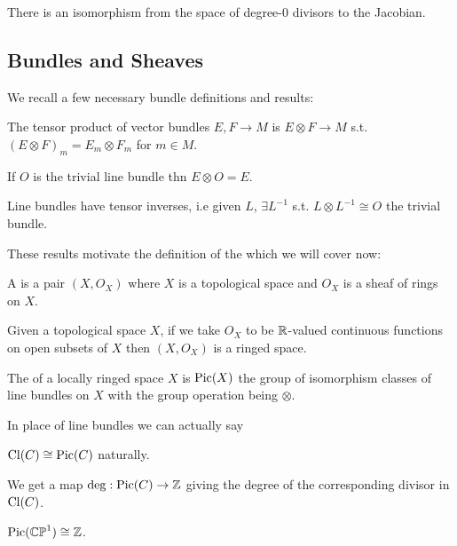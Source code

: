 \documentclass{article}
\begin{document}
\begin{corollary}
	There is an isomorphism from the space of degree-0 divisors to the Jacobian. 
\end{corollary}

\subsection{Bundles and Sheaves}
We recall a few necessary bundle definitions and results:
\begin{definition}
	The tensor product of vector bundles $E,F \to M$ is $E\otimes F \to M$ s.t. $(E \otimes F)_m = E_m \otimes F_m$ for $m \in M$. 
\end{definition}

\begin{lemma}
	If $O$ is the trivial line bundle thn $E\otimes O = E$. 
\end{lemma}

\begin{lemma}
	Line bundles have tensor inverses, i.e given $L$, $\exists L^{-1}$ s.t. $L \otimes L^{-1} \cong O$ the trivial bundle. 
\end{lemma}

These results motivate the definition of the  which we will cover now:

\begin{definition}
	A  is a pair $(X,O_X)$ where $X$ is a topological space and $O_X$ is a sheaf of rings on $X$. 
\end{definition}

\begin{example}
	Given a topological space $X$, if we take $O_X$ to be $\mathbb{R}$-valued continuous functions on open subsets of $X$ then $(X,O_X)$ is a ringed space. 
\end{example}

\begin{definition}
	The  of a locally ringed space $X$ is $\operatorname{Pic}(X)$ the group of isomorphism classes of line bundles on $X$ with the group operation being $\otimes$. 
\end{definition}

\begin{remark}
	In place of line bundles we can actually say  
\end{remark}

\begin{theorem}
	$\operatorname{Cl}(C) \cong \operatorname{Pic}(C)$ naturally. 
\end{theorem}
\begin{corollary}
	We get a map $\deg:\operatorname{Pic}(C) \to \mathbb{Z}$ giving the degree of the corresponding divisor in $\operatorname{Cl}(C)$. 
\end{corollary}
\begin{corollary}
	$\operatorname{Pic}(\mathbb{CP}^1) \cong \mathbb{Z}$. 
\end{corollary}
\end{document}
